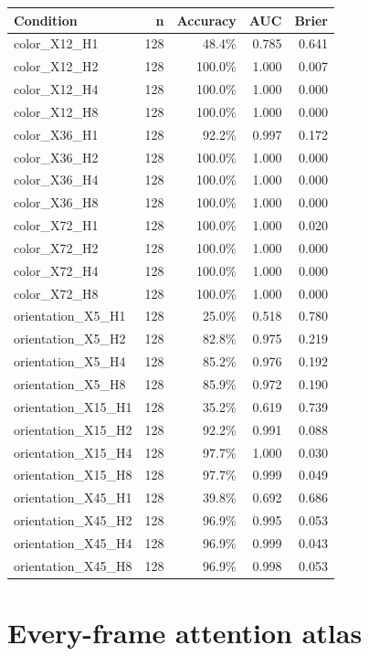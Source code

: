 \documentclass[11pt]{article}
\begin{document}
\small\begin{longtable}{p{}rrrr}\toprule Condition & n & Accuracy & AUC & Brier\\\midrule\endhead
color\_\allowbreak{}X12\_\allowbreak{}H1 & 128 & 48.4\% & 0.785 & 0.641\\
color\_\allowbreak{}X12\_\allowbreak{}H2 & 128 & 100.0\% & 1.000 & 0.007\\
color\_\allowbreak{}X12\_\allowbreak{}H4 & 128 & 100.0\% & 1.000 & 0.000\\
color\_\allowbreak{}X12\_\allowbreak{}H8 & 128 & 100.0\% & 1.000 & 0.000\\
color\_\allowbreak{}X36\_\allowbreak{}H1 & 128 & 92.2\% & 0.997 & 0.172\\
color\_\allowbreak{}X36\_\allowbreak{}H2 & 128 & 100.0\% & 1.000 & 0.000\\
color\_\allowbreak{}X36\_\allowbreak{}H4 & 128 & 100.0\% & 1.000 & 0.000\\
color\_\allowbreak{}X36\_\allowbreak{}H8 & 128 & 100.0\% & 1.000 & 0.000\\
color\_\allowbreak{}X72\_\allowbreak{}H1 & 128 & 100.0\% & 1.000 & 0.020\\
color\_\allowbreak{}X72\_\allowbreak{}H2 & 128 & 100.0\% & 1.000 & 0.000\\
color\_\allowbreak{}X72\_\allowbreak{}H4 & 128 & 100.0\% & 1.000 & 0.000\\
color\_\allowbreak{}X72\_\allowbreak{}H8 & 128 & 100.0\% & 1.000 & 0.000\\
orientation\_\allowbreak{}X5\_\allowbreak{}H1 & 128 & 25.0\% & 0.518 & 0.780\\
orientation\_\allowbreak{}X5\_\allowbreak{}H2 & 128 & 82.8\% & 0.975 & 0.219\\
orientation\_\allowbreak{}X5\_\allowbreak{}H4 & 128 & 85.2\% & 0.976 & 0.192\\
orientation\_\allowbreak{}X5\_\allowbreak{}H8 & 128 & 85.9\% & 0.972 & 0.190\\
orientation\_\allowbreak{}X15\_\allowbreak{}H1 & 128 & 35.2\% & 0.619 & 0.739\\
orientation\_\allowbreak{}X15\_\allowbreak{}H2 & 128 & 92.2\% & 0.991 & 0.088\\
orientation\_\allowbreak{}X15\_\allowbreak{}H4 & 128 & 97.7\% & 1.000 & 0.030\\
orientation\_\allowbreak{}X15\_\allowbreak{}H8 & 128 & 97.7\% & 0.999 & 0.049\\
orientation\_\allowbreak{}X45\_\allowbreak{}H1 & 128 & 39.8\% & 0.692 & 0.686\\
orientation\_\allowbreak{}X45\_\allowbreak{}H2 & 128 & 96.9\% & 0.995 & 0.053\\
orientation\_\allowbreak{}X45\_\allowbreak{}H4 & 128 & 96.9\% & 0.999 & 0.043\\
orientation\_\allowbreak{}X45\_\allowbreak{}H8 & 128 & 96.9\% & 0.998 & 0.053\\
\bottomrule\end{longtable}\normalsize\section{Every-frame attention atlas}
\end{document}
